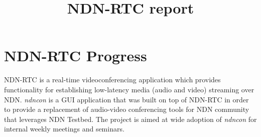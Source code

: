 \documentclass{article}
\title{NDN-RTC report}
\newcommand{\ndnrtcName}{NDN-RTC} %
\newcommand{\ndnconName}{\emph{ndncon}}
\begin{document}
\maketitle



\section{\ndnrtcName{} Progress}

\ndnrtcName{} is a real-time videoconferencing application which provides functionality for establishing low-latency media (audio and video) streaming over NDN. \ndnconName{} is a GUI application that was built on top of \ndnrtcName{} in order to provide a replacement of audio-video conferencing tools for NDN community that leverages NDN Testbed. The project is aimed at wide adoption of \ndnconName{} for internal weekly meetings and seminars. 
\end{document}
